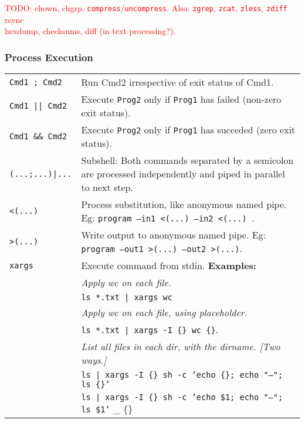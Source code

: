 \textcolor{red}{TODO: chown, chgrp.}
\textcolor{red}{\texttt{compress}/\texttt{uncompress}. Also: \texttt{zgrep}, \texttt{zcat}, \texttt{zless}, \texttt{zdiff}}
\textcolor{red}{rsync}\\
\textcolor{red}{hexdump, checksums, diff (in text processing?).}\\

\subsubsection{Process Execution}

\begin{tabularx}{\linewidth}{lX}

    \texttt{Cmd1 ; Cmd2}        & Run Cmd2 irrespective of exit status of Cmd1.\\
    \texttt{Cmd1 || Cmd2}       & Execute \texttt{Prog2} only if \texttt{Prog1} has failed (non-zero exit status).\\
    \texttt{Cmd1 \&\& Cmd2}     & Execute \texttt{Prog2} only if \texttt{Prog1} has succeded (zero exit status).\\
    \texttt{(...;...)|...}      & Subshell: Both commands separated by a semicolon are processed independently and piped in parallel to next step. \\
    \texttt{<(...)}             & Process substitution, like anonymous named pipe. Eg: \texttt{program --in1 <(...) --in2 <(...) }.\\
    \texttt{>(...)}             & Write output to anonymous named pipe. Eg: \texttt{program --out1 >(...) --out2 >(...)}.\\
    \hline

    \texttt{xargs}              & Execute command from stdin. \textbf{Examples:}\\
                                & \textit{Apply wc on each file.}\\
                                & \texttt{ls *.txt | xargs wc}\\
                                & \textit{Apply wc on each file, using placeholder.}\\
                                & \texttt{ls *.txt | xargs -I \{\} wc \{\}}.\\
                                & \textit{List all files in each dir, with the dirname. [Two ways.]}\\
                                & \texttt{ls | xargs -I \{\} sh -c 'echo \{\}; echo "---"; ls \{\}'}\\
                                & \texttt{ls | xargs -I \{\} sh -c 'echo \$1; echo "---"; ls \$1'} \_ \{\}\\
    \hline


\end{tabularx}
